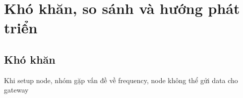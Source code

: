 

\chapter{Khó khăn, so sánh và hướng phát triển}


\section{Khó khăn}
Khi setup node, nhóm gặp vấn đề về frequency, node không thể gửi data cho gateway